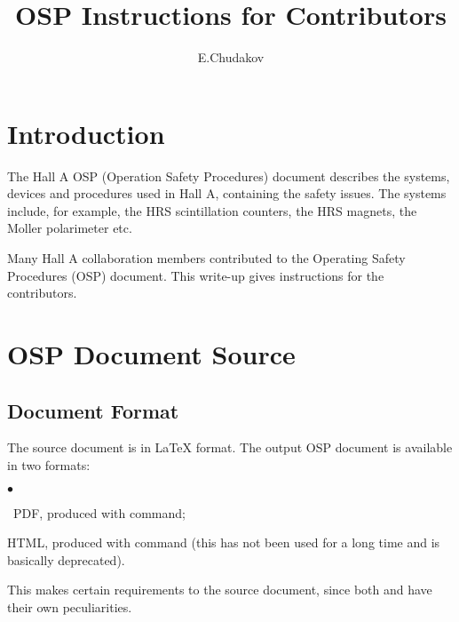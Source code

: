 \documentclass[12pt,letterpaper]{article}
\begin{document}
\color{\Mcol}
\pagestyle{headings}

\hypersetup{pageanchor=false}
\begin{titlepage}
\title{{\bf OSP Instructions for Contributors}}

\author{E.Chudakov} 
\setcounter{tocdepth}{3}
\end{titlepage} 
\maketitle 
\hypersetup{pageanchor=true}
 
\tableofcontents



\section{Introduction}
\label{sec:intro}

  The Hall A\cite{Hallawww} OSP (Operation Safety Procedures) document describes  
  the systems, devices and procedures used in Hall A, containing
  the safety issues. The systems include, for example, the HRS
  scintillation counters, the HRS magnets, the Moller polarimeter
  etc. 

  Many Hall A collaboration members contributed to the Operating Safety 
  Procedures (OSP) document. This write-up gives instructions for the
  contributors\cite{OSPgen}.

\section{OSP Document Source}
\label{sec:document}
   
\subsection{Document Format}
\label{sec:format}   

  The source document is in \LaTeX{} format.
  The output OSP document is available in two formats: 
  \begin{list}{$\bullet$}{\setlength{\itemsep}{-0.15cm}}
    \item ~PDF, produced with  command; 
    \item HTML, produced with  command (this has not been used for a long
          time and is basically deprecated). 
  \end{list}
  This makes certain requirements to the source document,
  since both  and  have their own
  peculiarities.
\end{document}
